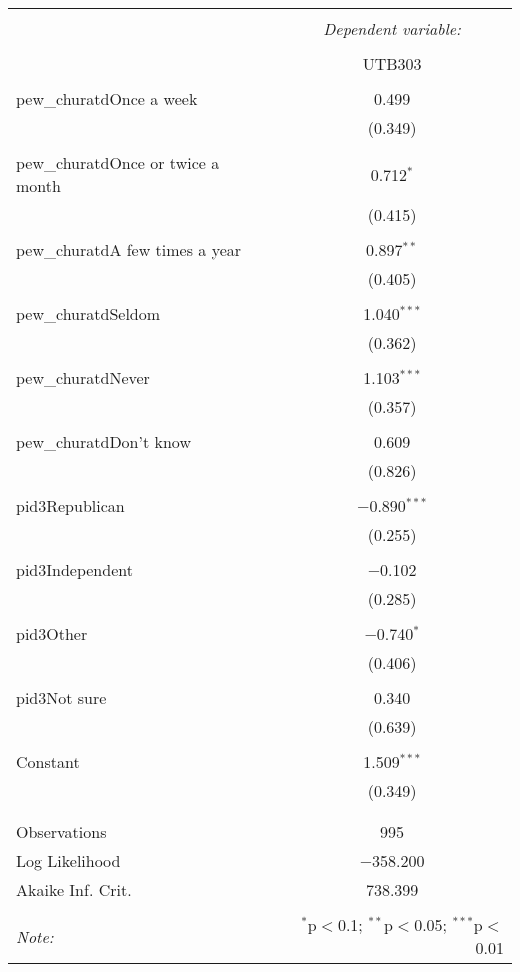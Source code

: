 
\begin{table}[!htbp] \centering 
  \caption{} 
  \label{} 
\begin{tabular}{@{\extracolsep{5pt}}lc} 
\\[-1.8ex]\hline 
\hline \\[-1.8ex] 
 & \multicolumn{1}{c}{\textit{Dependent variable:}} \\ 
\cline{2-2} 
\\[-1.8ex] & UTB303 \\ 
\hline \\[-1.8ex] 
 pew\_churatdOnce a week & 0.499 \\ 
  & (0.349) \\ 
  & \\ 
 pew\_churatdOnce or twice a month & 0.712$^{*}$ \\ 
  & (0.415) \\ 
  & \\ 
 pew\_churatdA few times a year & 0.897$^{**}$ \\ 
  & (0.405) \\ 
  & \\ 
 pew\_churatdSeldom & 1.040$^{***}$ \\ 
  & (0.362) \\ 
  & \\ 
 pew\_churatdNever & 1.103$^{***}$ \\ 
  & (0.357) \\ 
  & \\ 
 pew\_churatdDon't know & 0.609 \\ 
  & (0.826) \\ 
  & \\ 
 pid3Republican & $-$0.890$^{***}$ \\ 
  & (0.255) \\ 
  & \\ 
 pid3Independent & $-$0.102 \\ 
  & (0.285) \\ 
  & \\ 
 pid3Other & $-$0.740$^{*}$ \\ 
  & (0.406) \\ 
  & \\ 
 pid3Not sure & 0.340 \\ 
  & (0.639) \\ 
  & \\ 
 Constant & 1.509$^{***}$ \\ 
  & (0.349) \\ 
  & \\ 
\hline \\[-1.8ex] 
Observations & 995 \\ 
Log Likelihood & $-$358.200 \\ 
Akaike Inf. Crit. & 738.399 \\ 
\hline 
\hline \\[-1.8ex] 
\textit{Note:}  & \multicolumn{1}{r}{$^{*}$p$<$0.1; $^{**}$p$<$0.05; $^{***}$p$<$0.01} \\ 
\end{tabular} 
\end{table} 
